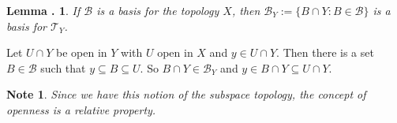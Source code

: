 \documentclass[twoside]{report}
\newcounter{Lecture}
\theoremstyle{myts}
\newcounter{c}[Lecture]
\newtheorem{lma}[c]{Lemma \arabic{Lecture}.}
\newtheorem*{nte}{Note}
\newenvironment{prf}{
  \noindent\begin{mdframed}[style=prf]}{\end{mdframed} \vspace{1em}
}
\begin{document}
\begin{lma}
  If $\mathcal{B}$ is a basis for the topology $X$, then \( \mathcal{B}_Y := \{ B\cap Y : B\in\mathcal{B} \}\) is a basis for \(\mathcal{T}_Y\).
\end{lma}

\begin{prf}
  Let \( U\cap Y\) be open in $Y$ with $U$ open in $X$ and \(y\in U\cap Y\). Then there is a set \(B\in\mathcal{B}\) such that \(y\subseteq B \subseteq U \). So \( B\cap Y \in \mathcal{B}_Y \) and \(y \in B\cap Y \subseteq U\cap Y \).
\end{prf}

\begin{nte}
  Since we have this notion of the subspace topology, the concept of openness is a relative property.
\end{nte}
\end{document}
